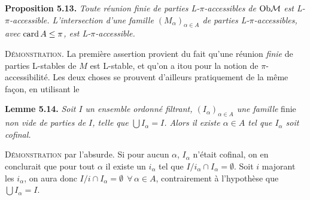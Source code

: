 \textbf{Proposition 5.13.} \textit{Toute réunion finie de parties L-$\pi$-accessibles de} $\mathrm{Ob}\mathcal{M}$ \textit{est L-$\pi$-accessible. L'intersection d'une famille $(M_{\alpha})_{\alpha\in A}$ de parties L-$\pi$-accessibles, avec} $\operatorname{card} A \leq \pi$\textit{, est L-$\pi$-accessible.}

\textsc{Démonstration}. La première assertion provient du fait qu'une réunion \textit{finie} de parties L-stables de $M$ est L-stable, et qu'on a itou pour la notion de $\pi$-accessibilité. Les deux choses se prouvent d'ailleurs pratiquement de la même façon, en utilisant le

\textbf{Lemme 5.14.} \textit{Soit $I$ un ensemble ordonné filtrant, $(I_{\alpha})_{\alpha\in A}$ une famille} finie \textit{non vide de parties de $I$, telle que $\bigcup I_{\alpha} = I$. Alors il existe $\alpha \in A$ tel que $I_{\alpha}$ soit cofinal.}

\textsc{Démonstration} par l'absurde. Si pour aucun $\alpha$, $I_{\alpha}$ n'était cofinal, on en conclurait que pour tout $\alpha$ il existe un $i_{\alpha}$ tel que $I/i_{\alpha} \cap I_{\alpha} = \emptyset$. Soit $i$ majorant les $i_{\alpha}$, on aura donc $I/i \cap I_{\alpha} = \emptyset \ \ \forall\, \alpha \in A$, contrairement à l'hypothèse que $\bigcup I_{\alpha} = I$.

